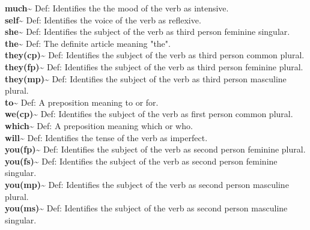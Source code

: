 {\textbf{much\textasciitilde{}} Def: Identifies the the mood of the verb as intensive.\hfill{}\\

\textbf{self\textasciitilde{}} Def: Identifies the voice of the verb as reflexive.\hfill{}\\

\textbf{she\textasciitilde{}} Def: Identifies the subject of the verb as third person feminine singular.\hfill{}\\

\textbf{the\textasciitilde{}} Def: The definite article meaning "the". \hfill{}\\

\textbf{they(cp)\textasciitilde{}} Def: Identifies the subject of the verb as third person common plural.\hfill{}\\

\textbf{they(fp)\textasciitilde{}} Def: Identifies the subject of the verb as third person feminine plural.\hfill{}\\

\textbf{they(mp)\textasciitilde{}} Def: Identifies the subject of the verb as third person masculine plural.\hfill{}\\

\textbf{to\textasciitilde{}} Def: A preposition meaning to or for.\hfill{}\\

\textbf{we(cp)\textasciitilde{}} Def: Identifies the subject of the verb as first person common plural.\hfill{}\\

\textbf{which\textasciitilde{}} Def: A preposition meaning which or who.\hfill{}\\

\textbf{will\textasciitilde{}} Def: Identifies the tense of the verb as imperfect.\hfill{}\\

\textbf{you(fp)\textasciitilde{}} Def: Identifies the subject of the verb as second person feminine plural.\hfill{}\\

\textbf{you(fs)\textasciitilde{}} Def: Identifies the subject of the verb as second person feminine singular.\hfill{}\\

\textbf{you(mp)\textasciitilde{}} Def: Identifies the subject of the verb as second person masculine plural.\hfill{}\\

\textbf{you(ms)\textasciitilde{}} Def: Identifies the subject of the verb as second person masculine singular.\hfill{}\\

}

